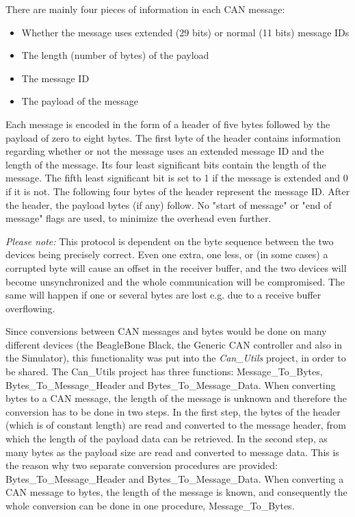 There are mainly four pieces of information in each CAN message: 
\begin{itemize}
   \item { Whether the message uses extended (29 bits) or normal (11 bits) message IDs} 
   \item { The length (number of bytes) of the payload} 
   \item { The message ID}
   \item { The payload of the message}
\end{itemize}

Each message is encoded in the form of a header of five bytes followed by the payload of zero to eight bytes. The first byte of the header contains information regarding whether or not the message uses an extended message ID and the length of the message. Its four least significant bits contain the length of the message. The fifth least significant bit is set to 1 if the message is extended and 0 if it is not.  \newline
The following four bytes of the header represent the message ID. \newline
After the header, the payload bytes (if any) follow. \newline
No "start of message" or "end of message" flags are used, to minimize the overhead even further.

\emph{Please note:} This protocol is dependent on the byte sequence between the two devices being precisely correct. Even one extra, one less, or (in some cases) a corrupted byte will cause an offset in the receiver buffer, and the two devices will become unsynchronized and the whole communication will be compromised. The same will happen if one or several bytes are lost e.g. due to a receive buffer overflowing. \newline

Since conversions between CAN messages and bytes would be done on many different devices (the BeagleBone Black, the Generic CAN controller and also in the Simulator), this functionality was put into the \emph{Can\_Utils} project, in order to be shared. \newline
The Can\_Utils project has three functions: Message\_To\_Bytes, Bytes\_To\_Message\_Header and Bytes\_To\_Message\_Data.  \newline
When converting bytes to a CAN message, the length of the message is unknown and therefore the conversion has to be done in two steps. 
In the first step, the bytes of the header (which is of constant length) are read and converted to the message header, from which the length of the payload data can be retrieved. In the second step, as many bytes as the payload size are read and converted to message data. \newline
This is the reason why two separate conversion procedures are provided: Bytes\_To\_Message\_Header and \newline Bytes\_To\_Message\_Data.  \newline
When converting a CAN message to bytes, the length of the message is known, and consequently the whole conversion can be done in one procedure, Message\_To\_Bytes.

